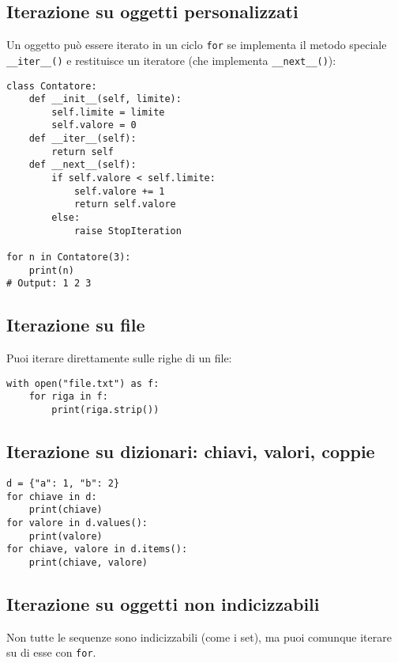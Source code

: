 \documentclass[a4paper,12pt]{article}
\begin{document}
\subsection*{Iterazione su oggetti personalizzati}
Un oggetto può essere iterato in un ciclo \texttt{for} se implementa il metodo speciale \texttt{\_\_iter\_\_()} e restituisce un iteratore (che implementa \texttt{\_\_next\_\_()}):
\begin{lstlisting}
class Contatore:
    def __init__(self, limite):
        self.limite = limite
        self.valore = 0
    def __iter__(self):
        return self
    def __next__(self):
        if self.valore < self.limite:
            self.valore += 1
            return self.valore
        else:
            raise StopIteration

for n in Contatore(3):
    print(n)
# Output: 1 2 3
\end{lstlisting}

\subsection*{Iterazione su file}
Puoi iterare direttamente sulle righe di un file:
\begin{lstlisting}
with open("file.txt") as f:
    for riga in f:
        print(riga.strip())
\end{lstlisting}

\subsection*{Iterazione su dizionari: chiavi, valori, coppie}
\begin{lstlisting}
d = {"a": 1, "b": 2}
for chiave in d:
    print(chiave)
for valore in d.values():
    print(valore)
for chiave, valore in d.items():
    print(chiave, valore)
\end{lstlisting}

\subsection*{Iterazione su oggetti non indicizzabili}
Non tutte le sequenze sono indicizzabili (come i set), ma puoi comunque iterare su di esse con \texttt{for}.
\end{document}
